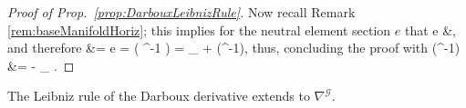 \documentclass[a4paper,oneside,11pt,bibliography=totoc]{scrartcl}
\def\bas#1\eas{\begin{align*}#1\end{align*}}
\theoremstyle{plain}
\theoremstyle{remark}
\theoremstyle{definition}
\begin{document}
\begin{proof}[Proof of Prop.\ \ref{prop:DarbouxLeibnizRule}]

Now recall Remark \ref{rem:baseManifoldHoriz}; this implies for the neutral element section $e$ that
\bas
\Delta e
&,
\eas
and therefore
\bas
0
&=
\Delta e
=
\Delta \mleft( \sigma \sigma^{-1} \mright)
=
_{\sigma} \circ \Delta \sigma
	+ \Delta\mleft(\sigma^{-1}\mright),
\eas
thus, concluding the proof with
\bas
\Delta\mleft(\sigma^{-1}\mright)
&=
- _{\sigma} \circ \Delta \sigma.
\eas
\end{proof}

The Leibniz rule of the Darboux derivative extends to $\nabla^{\mathcal{G}}$.
\end{document}
